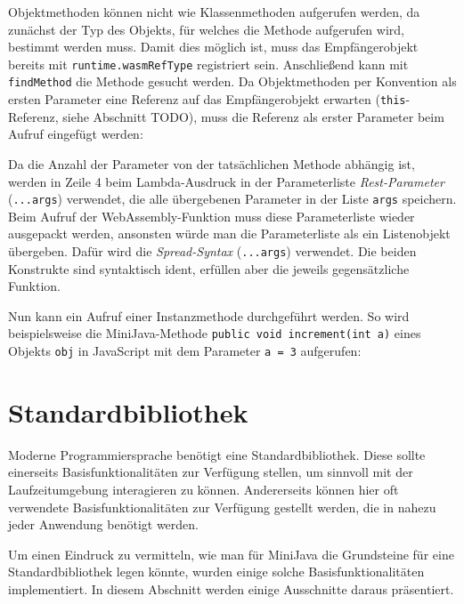 Objektmethoden können nicht wie Klassenmethoden aufgerufen werden, da zunächst der Typ des Objekts, für welches die Methode aufgerufen wird, bestimmt werden muss. Damit dies möglich ist, muss das Empfängerobjekt bereits mit \lstinline{runtime.wasmRefType} registriert sein. Anschließend kann mit \lstinline{findMethod} die Methode gesucht werden. Da Objektmethoden per Konvention als ersten Parameter eine Referenz auf das Empfängerobjekt erwarten (\lstinline{this}-Referenz, siehe Abschnitt TODO), muss die Referenz als erster Parameter beim Aufruf eingefügt werden:



Da die Anzahl der Parameter von der tatsächlichen Methode abhängig ist, werden in Zeile 4 beim Lambda-Ausdruck in der Parameterliste \emph{Rest-Parameter} (\lstinline{...args}) \cite{MDNJavaScript} verwendet, die alle übergebenen Parameter in der Liste \lstinline{args} speichern. Beim Aufruf der WebAssembly-Funktion muss diese Parameterliste wieder ausgepackt werden, ansonsten würde man die Parameterliste als ein Listenobjekt übergeben. Dafür wird die \emph{Spread-Syntax} (\lstinline{...args}) verwendet. Die beiden Konstrukte sind syntaktisch ident, erfüllen aber die jeweils gegensätzliche Funktion.

Nun kann ein Aufruf einer Instanzmethode durchgeführt werden. So wird beispielsweise die MiniJava-Methode \lstinline{public void increment(int a)} eines Objekts \lstinline{obj} in JavaScript mit dem Parameter \lstinline{a = 3} aufgerufen:



\section{Standardbibliothek}

Moderne Programmiersprache benötigt eine Standardbibliothek. Diese sollte einerseits Basisfunktionalitäten zur Verfügung stellen, um sinnvoll mit der Laufzeitumgebung interagieren zu können. Andererseits können hier oft verwendete Basisfunktionalitäten zur Verfügung gestellt werden, die in nahezu jeder Anwendung benötigt werden.

Um einen Eindruck zu vermitteln, wie man für MiniJava die Grundsteine für eine Standardbibliothek legen könnte, wurden einige solche Basisfunktionalitäten implementiert. In diesem Abschnitt werden einige Ausschnitte daraus präsentiert.

